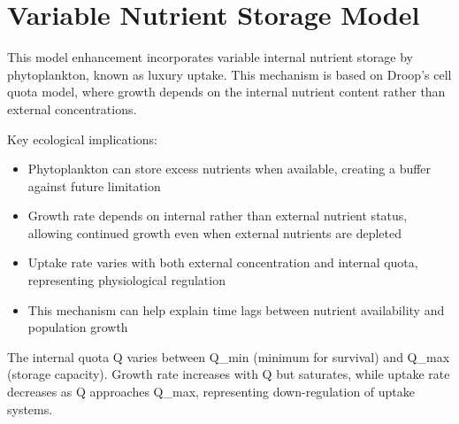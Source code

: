 \section{Variable Nutrient Storage Model}

This model enhancement incorporates variable internal nutrient storage by phytoplankton, known as luxury uptake. This mechanism is based on Droop's cell quota model, where growth depends on the internal nutrient content rather than external concentrations.

Key ecological implications:
\begin{itemize}
    \item Phytoplankton can store excess nutrients when available, creating a buffer against future limitation
    \item Growth rate depends on internal rather than external nutrient status, allowing continued growth even when external nutrients are depleted
    \item Uptake rate varies with both external concentration and internal quota, representing physiological regulation
    \item This mechanism can help explain time lags between nutrient availability and population growth
\end{itemize}

The internal quota Q varies between Q\_min (minimum for survival) and Q\_max (storage capacity). Growth rate increases with Q but saturates, while uptake rate decreases as Q approaches Q\_max, representing down-regulation of uptake systems.
